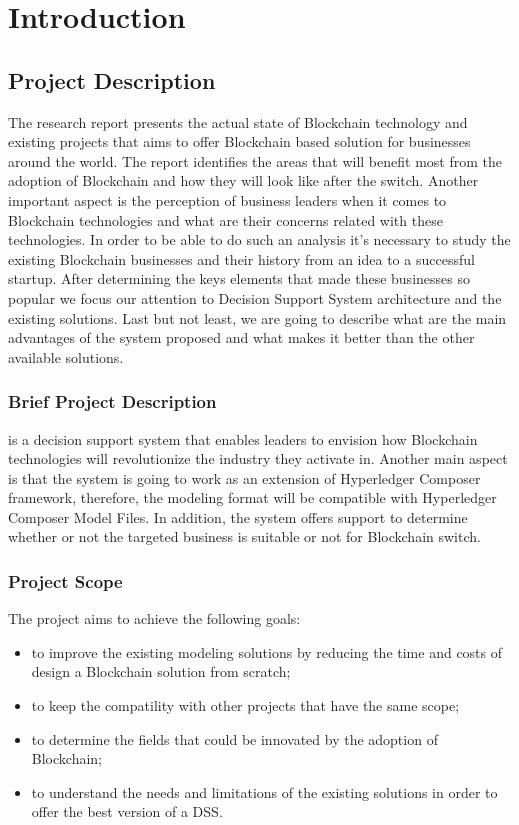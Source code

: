 \chapter{Introduction}
\label{chapter:intro}

\section{Project Description}
\label{sec:intro-section1}
The research report presents the actual state of Blockchain technology and existing projects that aims to offer Blockchain based solution for businesses around the world. 
The report identifies the areas that will benefit most from the adoption of Blockchain and how they will look like after the switch. Another important aspect is the perception of business leaders when it comes to Blockchain technologies and what are their concerns related with these technologies.
In order to be able to do such an analysis it’s necessary to study the existing Blockchain businesses and their history from an idea to a successful startup. After determining the keys elements that made these businesses so popular we focus our attention to Decision Support System architecture and the existing solutions. Last but not least, we are going to describe what are the main advantages of the system proposed and what makes it better than the other available solutions.

\subsection{Brief Project Description}
\label{sub-sec:intro-subsection1}
\textbf{\project} is a decision support system that enables leaders to envision how Blockchain technologies will revolutionize the industry they activate in.
Another main aspect is that the system is going to work as an extension of Hyperledger Composer framework, therefore, the modeling format will be compatible with Hyperledger Composer Model Files.
In addition, the system offers support to determine whether or not the targeted business is suitable or not for Blockchain switch.


\subsection{Project Scope}
\label{sub-sec:intro-subsection2}
The project aims to achieve the following goals:
\begin{itemize}
	\item to improve the existing modeling solutions by reducing the time and costs of design a Blockchain solution from scratch;
	\item to keep the compatility with other projects that have the same scope;
	\item to determine the fields that could be innovated by the adoption of Blockchain;
	\item to understand the needs and limitations of the existing solutions in order to offer the best version of a DSS.
\end{itemize}  


